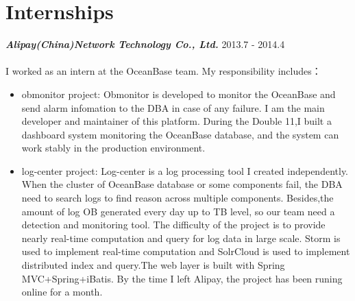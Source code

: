 \documentclass[10pt]{article} %
\begin{document}
\color{text1} %




\begin{minipage}[t]{0.6\textwidth} %
\vspace{0pt} %



\section{Internships}

{\bf \large \textit{Alipay(China)Network Technology Co., Ltd.}} \hfill  \hfill {2013.7 - 2014.4\\}\\
{I worked as an intern at the OceanBase team. My responsibility includes：}
\begin{itemize} \itemsep -1pt 
\item obmonitor project: Obmonitor is developed to monitor the OceanBase and send alarm infomation to the DBA in case of any failure. I am the main developer and maintainer of this platform. During the Double 11,I built a dashboard system monitoring the OceanBase database, and the system can work stably in the production environment.
\item log-center project: Log-center is a log processing tool I created independently. When the cluster of OceanBase database or some components fail, the DBA need to search logs to find reason across multiple components. Besides,the amount of log OB generated every day up to TB level, so our team need a detection and monitoring tool. The difficulty of the project is to provide nearly real-time computation and query for log data in large scale. Storm is used to implement real-time computation and SolrCloud is used to implement distributed index and query.The web layer is built with Spring MVC+Spring+iBatis. By the time I left Alipay, the project has been runing online for a month.
\end{itemize}


\end{minipage}
\end{document}
